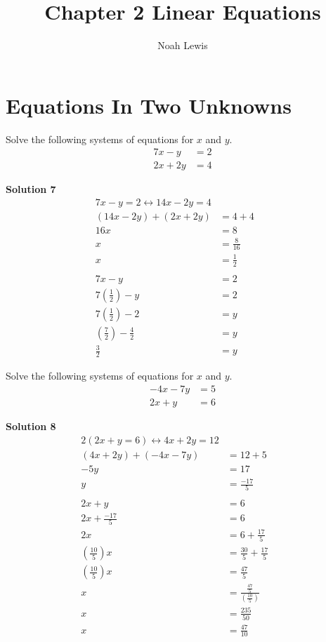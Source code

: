 \documentclass[6pt]{article}
\title{Chapter 2 Linear Equations}
\author{Noah Lewis}
\begin{document}
\maketitle

\section{Equations In Two Unknowns}

\begin{tcolorbox}[title=Problem 7, breakable]
    Solve the following systems of equations for $x$ and $y$.
    \begin{align*}
        7x - y &= 2 \\
        2x + 2y &= 4
    \end{align*}
\end{tcolorbox}

\textbf{Solution 7}
\begin{align*}
    7x - y = 2 \leftrightarrow 14x - 2y = 4 && \\
    (14x - 2y) + (2x + 2y) &= 4 + 4 && \\
    16x &= 8 && \\
    x &= \frac{8}{16} && \\
    x &= \frac{1}{2} && \\ \\
    7x - y &= 2 && \\
    7(\frac{1}{2}) - y &= 2 && \\
    7(\frac{1}{2}) - 2 &= y && \\
    (\frac{7}{2}) - \frac{4}{2} &= y && \\
    \frac{3}{2} &= y
\end{align*}

\begin{tcolorbox}[title=Problem 8, breakable]
    Solve the following systems of equations for $x$ and $y$.
    \begin{align*}
        -4x - 7y &= 5 \\
        2x + y &= 6
    \end{align*}
\end{tcolorbox}

\textbf{Solution 8}
\begin{align*}
    2(2x + y = 6) \leftrightarrow 4x + 2y = 12 && \\
    (4x + 2y) + (-4x - 7y) &= 12 + 5 && \\
    -5y &= 17 && \\
    y &= \frac{-17}{5} && \\ \\
    2x + y &= 6 && \\
    2x + \frac{-17}{5} &= 6 && \\
    2x &= 6  + \frac{17}{5} && \\
    (\frac{10}{5})x &= \frac{30}{5}  + \frac{17}{5} && \\
    (\frac{10}{5})x &= \frac{47}{5} && \\
    x &= \frac{\frac{47}{5}}{(\frac{10}{5})} && \\
    x &= \frac{235}{50} && \\
    x &= \frac{47}{10} && \\
\end{align*}
\end{document}
